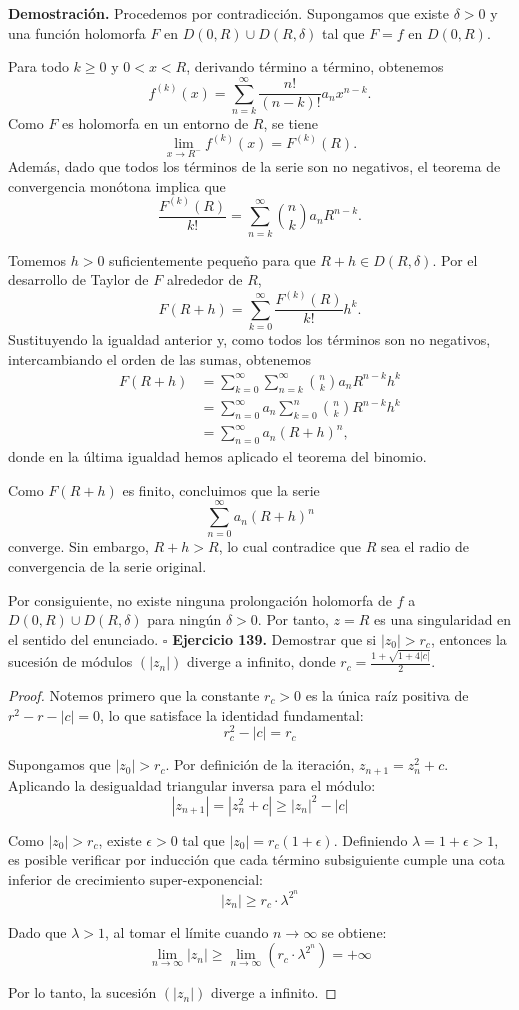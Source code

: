 \documentclass[11pt,a4paper]{article}
\theoremstyle{definition}
\theoremstyle{plain}
\theoremstyle{remark}
\begin{document}
	\textbf{Demostración.} Procedemos por contradicción. Supongamos que existe \(\delta>0\) y una función holomorfa \(F\) en \(D(0,R)\cup D(R,\delta)\) tal que \(F=f\) en \(D(0,R)\).
	
	Para todo \(k\geq 0\) y \(0<x<R\), derivando término a término, obtenemos
	\[
	f^{(k)}(x)=\sum_{n=k}^{\infty}
	\frac{n!}{(n-k)!}a_nx^{n-k}.
	\]
	Como \(F\) es holomorfa en un entorno de \(R\), se tiene
	\[
	\lim_{x\to R^-}f^{(k)}(x)=F^{(k)}(R).
	\]
	Además, dado que todos los términos de la serie son no negativos, el teorema de convergencia monótona implica que
	\[
	\frac{F^{(k)}(R)}{k!}
	=\sum_{n=k}^{\infty}\binom{n}{k}a_nR^{n-k}.
	\]
	
	Tomemos \(h>0\) suficientemente pequeño para que \(R+h\in D(R,\delta)\). Por el desarrollo de Taylor de \(F\) alrededor de \(R\),
	\[
	F(R+h)=\sum_{k=0}^{\infty}
	\frac{F^{(k)}(R)}{k!}h^k.
	\]
	Sustituyendo la igualdad anterior y, como todos los términos son no negativos, intercambiando el orden de las sumas, obtenemos
	\[
	\begin{aligned}
		F(R+h)
		&=\sum_{k=0}^{\infty}
		\sum_{n=k}^{\infty}
		\binom{n}{k}a_nR^{n-k}h^k\\
		&=\sum_{n=0}^{\infty}a_n
		\sum_{k=0}^{n}\binom{n}{k}R^{n-k}h^k\\
		&=\sum_{n=0}^{\infty}a_n(R+h)^n,
	\end{aligned}
	\]
	donde en la última igualdad hemos aplicado el teorema del binomio.
	
	Como \(F(R+h)\) es finito, concluimos que la serie
	\[
	\sum_{n=0}^{\infty}a_n(R+h)^n
	\]
	converge. Sin embargo, \(R+h>R\), lo cual contradice que \(R\) sea el radio de convergencia de la serie original.
	
	Por consiguiente, no existe ninguna prolongación holomorfa de \(f\) a \(D(0,R)\cup D(R,\delta)\) para ningún \(\delta>0\). Por tanto, \(z=R\) es una singularidad en el sentido del enunciado. \(\square\)
	\noindent\textbf{Ejercicio 139.} Demostrar que si $|z_0| > r_c$, entonces la sucesión de módulos $(|z_n|)$ diverge a infinito, donde $r_c = \frac{1 + \sqrt{1 + 4|c|}}{2}$.
	
	\begin{proof}
		Notemos primero que la constante $r_c > 0$ es la única raíz positiva de $r^2 - r - |c| = 0$, lo que satisface la identidad fundamental:
		\[ r_c^2 - |c| = r_c \]
		
		Supongamos que $|z_0| > r_c$. Por definición de la iteración, $z_{n+1} = z_n^2 + c$. Aplicando la desigualdad triangular inversa para el módulo:
		\[ |z_{n+1}| = |z_n^2 + c| \ge |z_n|^2 - |c| \]
		
		Como $|z_0| > r_c$, existe $\epsilon > 0$ tal que $|z_0| = r_c(1 + \epsilon)$. Definiendo $\lambda = 1 + \epsilon > 1$, es posible verificar por inducción que cada término subsiguiente cumple una cota inferior de crecimiento super-exponencial:
		\[ |z_n| \ge r_c \cdot \lambda^{2^n} \]
		
		Dado que $\lambda > 1$, al tomar el límite cuando $n \to \infty$ se obtiene:
		\[ \lim_{n \to \infty} |z_n| \ge \lim_{n \to \infty} (r_c \cdot \lambda^{2^n}) = +\infty \]
		
		Por lo tanto, la sucesión $(|z_n|)$ diverge a infinito.
	\end{proof}
	
\end{document}
